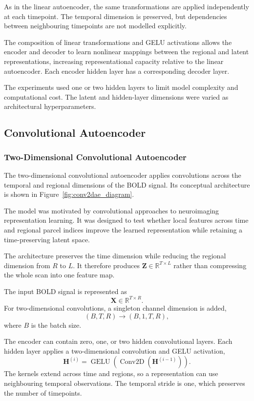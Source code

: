 As in the linear autoencoder, the same transformations are applied
independently at each timepoint. The temporal dimension is preserved,
but dependencies between neighbouring timepoints are not modelled
explicitly.

The composition of linear transformations and GELU activations allows the
encoder and decoder to learn nonlinear mappings between the regional and
latent representations, increasing representational capacity relative to
the linear autoencoder. Each encoder hidden layer has a corresponding decoder layer.

The experiments used one or two hidden layers to limit model complexity
and computational cost. The latent and hidden-layer dimensions were
varied as architectural hyperparameters.




\subsection{Convolutional Autoencoder}

\subsubsection{Two-Dimensional Convolutional Autoencoder}

The two-dimensional convolutional autoencoder applies convolutions
across the temporal and regional dimensions of the BOLD signal. Its
conceptual architecture is shown in Figure~\ref{fig:conv2dae_diagram}.

The model was motivated by convolutional approaches to neuroimaging
representation learning. It was designed to test whether local features
across time and regional parcel indices improve the learned
representation while retaining a time-preserving latent space.

The architecture preserves the time dimension while reducing the regional
dimension from $R$ to $L$. It therefore produces
$\mathbf{Z}\in\mathbb{R}^{T\times L}$ rather than compressing the whole
scan into one feature map.

The input BOLD signal is represented as
\[
\mathbf{X}\in\mathbb{R}^{T\times R}.
\]
For two-dimensional convolutions, a singleton channel dimension is added,
\[
(B,T,R)\rightarrow(B,1,T,R),
\]
where $B$ is the batch size.

The encoder can contain zero, one, or two hidden convolutional layers.
Each hidden layer applies a two-dimensional convolution and GELU
activation,
\[
\mathbf{H}^{(i)}
=
\operatorname{GELU}
\left(
\operatorname{Conv2D}
\left(
\mathbf{H}^{(i-1)}
\right)
\right).
\]
The kernels extend across time and regions, so a representation can use
neighbouring temporal observations. The temporal stride is one, which
preserves the number of timepoints.

